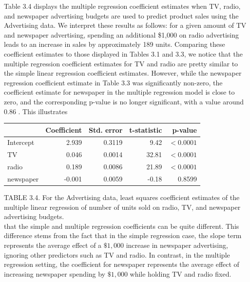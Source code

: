 \documentclass[10pt]{article}
\begin{document}
Table 3.4 displays the multiple regression coefficient estimates when TV, radio, and newspaper advertising budgets are used to predict product sales using the Advertising data. We interpret these results as follows: for a given amount of TV and newspaper advertising, spending an additional \$1,000 on radio advertising leads to an increase in sales by approximately 189 units. Comparing these coefficient estimates to those displayed in Tables 3.1 and 3.3, we notice that the multiple regression coefficient estimates for TV and radio are pretty similar to the simple linear regression coefficient estimates. However, while the newspaper regression coefficient estimate in Table 3.3 was significantly non-zero, the coefficient estimate for newspaper in the multiple regression model is close to zero, and the corresponding p-value is no longer significant, with a value around 0.86 . This illustrates

\begin{center}
\begin{tabular}{l|rrrr}
\hline
 & Coefficient & Std. error & t-statistic & p-value \\
\hline
Intercept & 2.939 & 0.3119 & 9.42 & $<0.0001$ \\
TV & 0.046 & 0.0014 & 32.81 & $<0.0001$ \\
radio & 0.189 & 0.0086 & 21.89 & $<0.0001$ \\
newspaper & -0.001 & 0.0059 & -0.18 & 0.8599 \\
\hline
\end{tabular}
\end{center}

TABLE 3.4. For the Advertising data, least squares coefficient estimates of the multiple linear regression of number of units sold on radio, TV, and newspaper advertising budgets.\\
that the simple and multiple regression coefficients can be quite different. This difference stems from the fact that in the simple regression case, the slope term represents the average effect of a $\$ 1,000$ increase in newspaper advertising, ignoring other predictors such as TV and radio. In contrast, in the multiple regression setting, the coefficient for newspaper represents the average effect of increasing newspaper spending by $\$ 1,000$ while holding TV and radio fixed.
\end{document}
